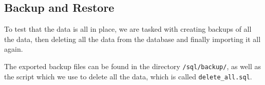 \subsection{Backup and Restore}

To test that the data is all in place, we are tasked with creating backups of all the data, then deleting all the data from the database and finally importing it all again.

The exported backup files can be found in the directory \verb`/sql/backup/`, as well as the script which we use to delete all the data, which is called \verb`delete_all.sql`.

